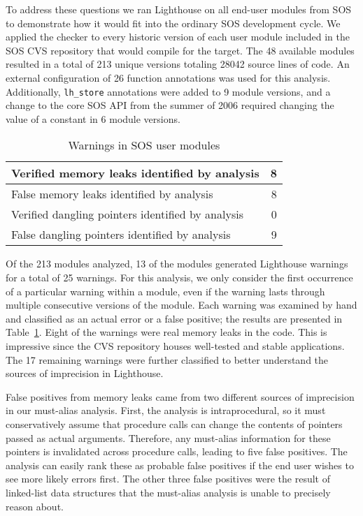 To address these questions we ran Lighthouse on 
all end-user modules from SOS
to demonstrate
how it would fit into the ordinary SOS development cycle.  
We applied the checker to every
historic version of each user module included in the SOS CVS
repository that would compile for the  target.  The 48
available modules resulted in a total of 213 unique versions totaling 28042
source lines of code.
%
An external configuration of 26 function annotations was used for this
analysis.
%
Additionally, {\tt lh\_store} annotations were added to 9 module versions,
and a change to the core SOS API from the summer of 2006 required
changing the value of a constant in 6 module versions.


\begin{table}
\caption{Warnings in SOS user modules}
%
\label{tab:module}
\centering 
\begin{tabular}{| l | r |}
    \hline 
    Verified memory leaks identified by analysis & 8 \\
    \hline
    False memory leaks identified by analysis & 8 \\
    \hline 
    Verified dangling pointers identified by analysis & 0 \\
    \hline 
    False dangling pointers identified by analysis & 9 \\
    \hline 
\end{tabular} 
%
\end{table}

Of the 213 modules analyzed, 13 of the modules generated Lighthouse 
warnings for a
total of 25 warnings.
For this
analysis, we only consider the first occurrence of a particular warning
within a module, even if the warning lasts through multiple consecutive
versions of the module.  
%
Each warning was examined by hand and classified as an actual error or
a false positive; the results are presented in Table~\ref{tab:module}.  
%
Eight of the warnings were real memory leaks in the code.
This is impressive since the CVS repository houses well-tested and stable
applications.
%
The 17 remaining warnings were further classified to better understand
the sources of imprecision in Lighthouse.  

\smallskip{}

False positives from memory leaks came from two different sources of
imprecision in our must-alias analysis.
First, the analysis is intraprocedural, so it must
conservatively
assume that procedure calls can change the contents of pointers passed
as actual arguments.  Therefore, any must-alias information for these
pointers is invalidated across procedure calls, leading to five false
positives.
The analysis can easily rank these as probable false
positives if the end user wishes to see more likely errors first.  The
other three false positives were the result of linked-list data structures
that the must-alias analysis is unable to precisely reason about.  

